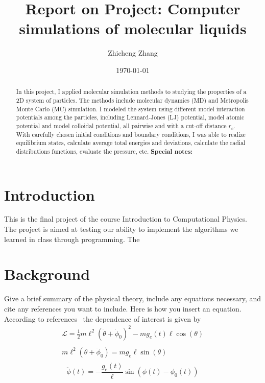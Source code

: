 \documentclass[letterpaper,12pt]{article}
\begin{document}
\title{Report on \textbf{Project: Computer simulations of molecular liquids}}
\author{Zhicheng Zhang}
\date{\today}
\maketitle

\begin{abstract}
In this project, I applied molecular simulation methods to studying the properties of a 2D system of particles. The methods include molecular dynamics (MD) and Metropolis Monte Carlo (MC) simulation. I modeled the system using different model interaction potentials among the particles, including Lennard-Jones (LJ) potential, model atomic potential and model colloidal potential, all pairwise and with a cut-off distance $r_c$. With carefully chosen initial conditions and boundary conditions, I was able to realize equilibrium states, calculate average total energies and deviations, calculate the radial distributions functions, evaluate the pressure, etc. \textbf{Special notes:} 
\end{abstract}


\section{Introduction}

This is the final project of the course Introduction to Computational Physics. The project is aimed at testing our ability to implement the algorithms we learned in class through programming. The 

\section{Background}

Give a brief summary of the physical theory, include any equations necessary, and cite any references you want to include. Here is how you insert an equation. According to
references~\cite{melissinos, Cyr, Wiki} the dependence of interest is given
by
\begin{gather*}
   \mathcal{L} =  \frac{1}{2} m \ell^2 ( \dot{\theta}+\dot{\phi}_0)^2 - m g_e(t) \ell \cos(\theta)\\
   \\
   m\ell^2 (\ddot{\theta} + \ddot{\phi}_0) = mg_e\ell\sin(\theta)\\
\end{gather*}
\begin{equation}
   \ddot{\phi}(t) = -\frac{g_e(t)}{\ell} \sin\left(\phi(t)-\phi_0(t)\right)
   \label{Eq:equation1} %
\end{equation}
\end{document}
